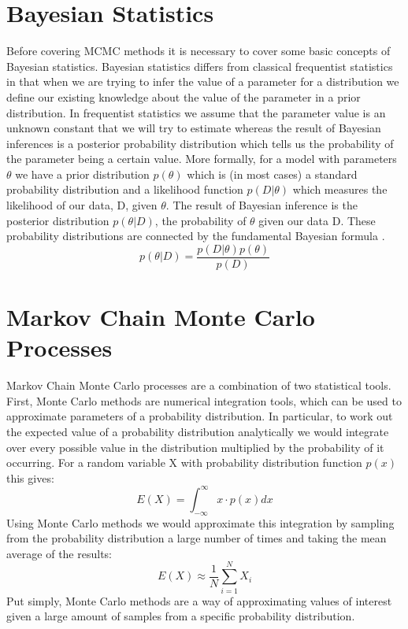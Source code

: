 \documentclass[11pt,a4paper]{report}
\begin{document}
\section{Bayesian Statistics}
Before covering MCMC methods it is necessary to cover some basic concepts of Bayesian statistics. Bayesian statistics differs from classical frequentist statistics in that when we are trying to infer the value of a parameter for a distribution we define our existing knowledge about the value of the parameter in a prior distribution. In frequentist statistics we assume that the parameter value is an unknown constant that we will try to estimate whereas the result of Bayesian inferences is a posterior probability distribution which tells us the probability of the parameter being a certain value. More formally, for a model with parameters $\theta$ we have a prior distribution $p(\theta)$ which is (in most cases) a standard probability distribution and a likelihood function $p(D | \theta)$ which measures the likelihood of our data, D, given $\theta$. The result of Bayesian inference is the posterior distribution $p(\theta | D)$, the probability of $\theta$ given our data D. These probability distributions are connected by the fundamental Bayesian formula \citep{Robert07}.  
\begin{equation}
p(\theta | D) = \frac{p(D | \theta)p(\theta)}{p(D)}
\end{equation}



\section{Markov Chain Monte Carlo Processes}
Markov Chain Monte Carlo processes are a combination of two statistical tools. First, Monte Carlo methods are numerical integration tools, which can be used to approximate parameters of a probability distribution. In particular, to work out the expected value of a probability distribution analytically we would integrate over every possible value in the distribution multiplied by the probability of it occurring. For a random variable X with probability distribution function $p(x)$ this gives:
\begin{equation}
E(X) = \int_{-\infty}^{\infty} x \cdot p(x) dx
\end{equation}
Using Monte Carlo methods we would approximate this integration by sampling from the probability distribution a large number of times and taking the mean average of the results:
\begin{equation}
E(X) \approx \frac{1}{N}\sum_{i=1}^{N} X_i 
\end{equation}
Put simply, Monte Carlo methods are a way of approximating values of interest given a large amount of samples from a specific probability distribution.
\end{document}
